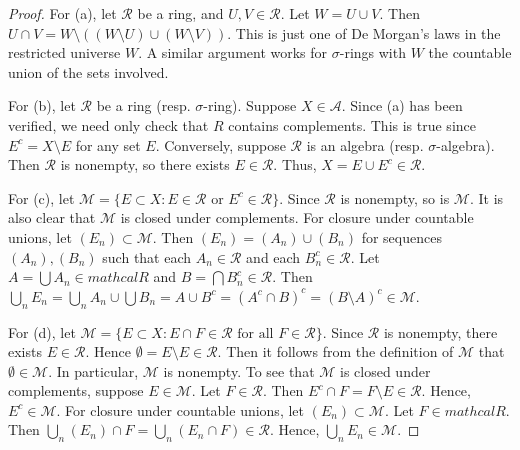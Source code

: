 \documentclass{article}
\begin{document}
\begin{proof}
For (a), let $\mathcal R$ be a ring, and $U, V \in \mathcal R$.  Let $W = U \cup V$.  Then $U \cap V = W \setminus ((W \setminus U) \cup (W \setminus V)) $. This is just one of De Morgan's laws in the restricted universe $W$.  A similar argument works for $\sigma$-rings with $W$ the countable union of the sets involved.

For (b), let $\mathcal R$ be a ring (resp. $\sigma$-ring).  Suppose $X \in \mathcal A$. Since (a) has been verified, we need only check that $R$ contains complements.  This is true since $E^c = X \setminus E$ for any set $E$.  Conversely, suppose $\mathcal R$ is an algebra (resp. $\sigma$-algebra).  Then $\mathcal R$ is nonempty, so there exists $E \in \mathcal R$. Thus, $X = E \cup E^c \in \mathcal R$.

For (c), let $\mathcal M = \{ E \subset X : E \in \mathcal R \text{ or } E^c \in \mathcal R \}$.  Since $\mathcal R$ is nonempty, so is $\mathcal M$.  It is also clear that $\mathcal M$ is closed under complements. For closure under countable unions, let $(E_n) \subset \mathcal M$.  Then $(E_n) = (A_n) \cup (B_n)$ for sequences $(A_n), (B_n)$ such that each $A_n \in \mathcal R$ and each $B_n^c \in \mathcal R$. Let $A = \bigcup A_n \in mathcal R$ and $B = \bigcap B_n^c \in \mathcal R$.  Then $\bigcup_n E_n = \bigcup_n A_n \cup \bigcup B_n = A \cup B^c = (A^c \cap B)^c = (B \setminus A)^c \in \mathcal M$. 

For (d), let $\mathcal M = \{ E \subset X : E \cap F \in \mathcal R \text{ for all } F \in \mathcal R \}$. Since $\mathcal R$ is nonempty, there exists $E \in \mathcal R$.  Hence $\emptyset = E \setminus E \in \mathcal R$. Then it follows from the definition of $\mathcal M$ that $\emptyset \in \mathcal M$. In particular, $\mathcal M$ is nonempty.  To see that $\mathcal M$ is closed under complements, suppose $E \in \mathcal M$.  Let $F \in \mathcal R$.  Then $E^c \cap F = F \setminus E \in \mathcal R$.  Hence, $E^c \in \mathcal M$.  For closure under countable unions, let $(E_n) \subset \mathcal M$. Let $F \in mathcal R$.  Then $\bigcup_n(E_n) \cap F = \bigcup_n (E_n \cap F)  \in \mathcal R$.  Hence, $\bigcup_n E_n \in \mathcal M$.
\end{proof}
\end{document}
